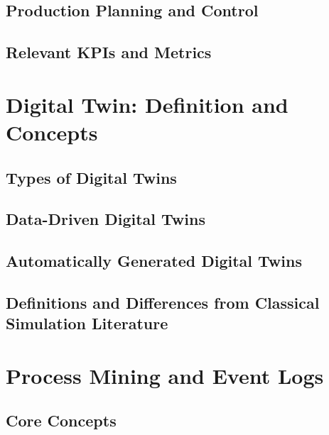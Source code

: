 \subsection{Production Planning and Control}

\subsection{Relevant KPIs and Metrics}

\section{Digital Twin: Definition and Concepts}
\label{sec:digital-twin}
\subsection{Types of Digital Twins}

\subsection{Data-Driven Digital Twins}

\subsection{Automatically Generated Digital Twins}
\subsection{Definitions and Differences from Classical Simulation Literature}

\section{Process Mining and Event Logs}
\label{sec:process-mining}

\subsection{Core Concepts}

